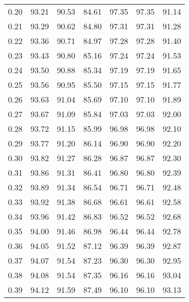 \begin{tabular}{|c|c|c|c|c|c|c|}
      0.20 &     93.21 &     90.53 &      84.61 &   97.35 &      97.35 &         91.14 \\
      0.21 &     93.29 &     90.62 &      84.80 &   97.31 &      97.31 &         91.28 \\
      0.22 &     93.36 &     90.71 &      84.97 &   97.28 &      97.28 &         91.40 \\
      0.23 &     93.43 &     90.80 &      85.16 &   97.24 &      97.24 &         91.53 \\
      0.24 &     93.50 &     90.88 &      85.34 &   97.19 &      97.19 &         91.65 \\
      0.25 &     93.56 &     90.95 &      85.50 &   97.15 &      97.15 &         91.77 \\
      0.26 &     93.63 &     91.04 &      85.69 &   97.10 &      97.10 &         91.89 \\
      0.27 &     93.67 &     91.09 &      85.84 &   97.03 &      97.03 &         92.00 \\
      0.28 &     93.72 &     91.15 &      85.99 &   96.98 &      96.98 &         92.10 \\
      0.29 &     93.77 &     91.20 &      86.14 &   96.90 &      96.90 &         92.20 \\
      0.30 &     93.82 &     91.27 &      86.28 &   96.87 &      96.87 &         92.30 \\
      0.31 &     93.86 &     91.31 &      86.41 &   96.80 &      96.80 &         92.39 \\
      0.32 &     93.89 &     91.34 &      86.54 &   96.71 &      96.71 &         92.48 \\
      0.33 &     93.92 &     91.38 &      86.68 &   96.61 &      96.61 &         92.58 \\
      0.34 &     93.96 &     91.42 &      86.83 &   96.52 &      96.52 &         92.68 \\
      0.35 &     94.00 &     91.46 &      86.98 &   96.44 &      96.44 &         92.78 \\
      0.36 &     94.05 &     91.52 &      87.12 &   96.39 &      96.39 &         92.87 \\
      0.37 &     94.07 &     91.54 &      87.23 &   96.30 &      96.30 &         92.95 \\
      0.38 &     94.08 &     91.54 &      87.35 &   96.16 &      96.16 &         93.04 \\
      0.39 &     94.12 &     91.59 &      87.49 &   96.10 &      96.10 &         93.13 \\

\end{tabular}

